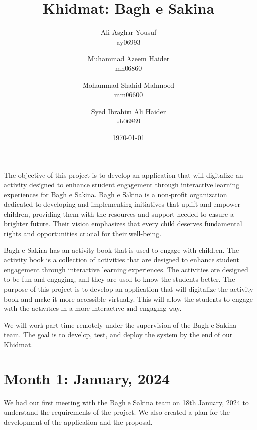 \documentclass{article}
\title {Khidmat: Bagh e Sakina}
\author{
  Ali Asghar Yousuf\\ ay06993
  \and
  Muhammad Azeem Haider\\ mh06860
  \and
  Mohammad Shahid Mahmood\\ mm06600
  \and
  Syed Ibrahim Ali Haider\\ sh06869
}
\date{\today}
\begin{document}
\maketitle


The objective of this project is to develop an application that will digitalize
an activity designed to enhance student engagement through interactive learning
experiences for Bagh e Sakina.
Bagh e Sakina is a non-profit organization dedicated to developing and
implementing initiatives that uplift and empower children, providing them with
the resources and support needed to ensure a brighter future. Their vision
emphasizes that every child deserves fundamental rights and opportunities
crucial for their well-being.

Bagh e Sakina has an activity book that is used to engage with children. The
activity book is a collection of activities that are designed to enhance
student engagement through interactive learning experiences. The activities are
designed to be fun and engaging, and they are used to know the students better.
The purpose of this project is to develop an application that will digitalize
the activity book and make it more accessible virtually. This will allow the
students to engage with the activities in a more interactive and engaging way.

We will work part time remotely under the supervision of the Bagh e Sakina
team. The goal is to develop, test, and deploy the system by the end of our
Khidmat.

\newpage %
\section*{Month 1: January, 2024}

We had our first meeting with the Bagh e Sakina team on 18th January, 2024 to
understand the requirements of the project. We also created a plan for the
development of the application and the proposal.
\end{document}
